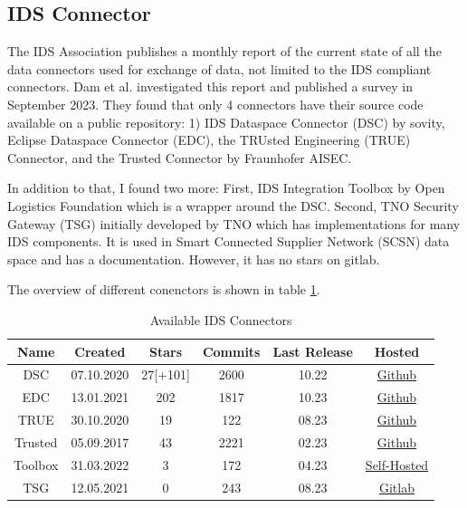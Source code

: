 \documentclass{article}
\begin{document}
\subsection*{IDS Connector}
The IDS Association publishes a monthly report of the current state of all the data connectors used for exchange of data, not limited to the IDS compliant connectors.
 Dam et al. \cite{dam_survey_2023} investigated this report and published a survey in September 2023. They found that only 4 connectors have their source code available on a public repository: 1) IDS Dataspace Connector (DSC) by sovity, Eclipse Dataspace Connector (EDC), the TRUsted Engineering (TRUE) Connector, and the Trusted Connector by Fraunhofer AISEC.

In addition to that, I found two more: First, IDS Integration Toolbox by Open Logistics Foundation which is a wrapper around the DSC. Second, TNO Security Gateway (TSG) initially developed by TNO which has implementations for many IDS components. It is used in Smart Connected Supplier Network (SCSN) data space and has a documentation.
However, it has no stars on gitlab.

The overview of different conenctors is shown in table \ref{tab:connectors}.

\begin{table}[ht]
    \label{tab:connectors}
    \centering
    \begin{tabular}{| c c c c c c|}
    \hline
    \textbf{Name} & \textbf{Created} & \textbf{Stars} & \textbf{Commits} & \textbf{Last Release} & \textbf{Hosted} \\
    \hline
    \hline
    DSC & 07.10.2020 & 27[+101] & 2600 & 10.22 & \href{https://github.com/International-Data-Spaces-Association/DataspaceConnector}{Github} \\
    \hline
    EDC & 13.01.2021 & 202 & 1817 & 10.23 & \href{https://github.com/eclipse-edc/Connector}{Github} \\
    \hline
    TRUE & 30.10.2020 & 19 & 122 & 08.23 & \href{https://github.com/Engineering-Research-and-Development/true-connector}{Github} \\
    \hline
    Trusted & 05.09.2017 & 43 & 2221 & 02.23 & \href{https://github.com/Fraunhofer-AISEC/trusted-connector}{Github} \\ 
    \hline
    Toolbox & 31.03.2022 & 3 & 172 & 04.23 & \href{https://git.openlogisticsfoundation.org/silicon-economy/base/ids/ids-integration-toolbox}{Self-Hosted} \\
    \hline
    TSG & 12.05.2021 & 0 & 243 & 08.23 & \href{https://gitlab.com/tno-tsg}{Gitlab} \\
    \hline
    \end{tabular}
    \caption{Available IDS Connectors}
\end{table}
\end{document}
